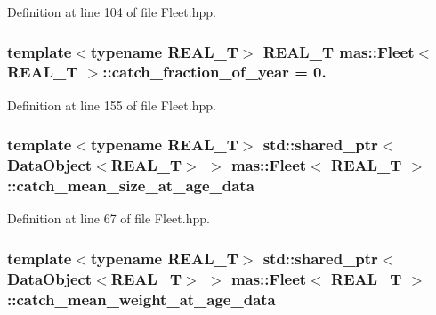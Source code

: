 Definition at line 104 of file Fleet.\-hpp.

\hypertarget{structmas_1_1_fleet_a441dfd7f3172ab329520882e66669ddd}{
\subsubsection[{catch\-\_\-fraction\-\_\-of\-\_\-year}]{\setlength{\rightskip}{0pt plus 5cm}template$<$typename R\-E\-A\-L\-\_\-\-T$>$ R\-E\-A\-L\-\_\-\-T {\bf mas\-::\-Fleet}$<$ R\-E\-A\-L\-\_\-\-T $>$\-::catch\-\_\-fraction\-\_\-of\-\_\-year = 0.}}\label{structmas_1_1_fleet_a441dfd7f3172ab329520882e66669ddd}


Definition at line 155 of file Fleet.\-hpp.

\hypertarget{structmas_1_1_fleet_a46862ac16c8d360c9290dad74aee9a17}{
\subsubsection[{catch\-\_\-mean\-\_\-size\-\_\-at\-\_\-age\-\_\-data}]{\setlength{\rightskip}{0pt plus 5cm}template$<$typename R\-E\-A\-L\-\_\-\-T$>$ std\-::shared\-\_\-ptr$<${\bf Data\-Object}$<$R\-E\-A\-L\-\_\-\-T$>$ $>$ {\bf mas\-::\-Fleet}$<$ R\-E\-A\-L\-\_\-\-T $>$\-::catch\-\_\-mean\-\_\-size\-\_\-at\-\_\-age\-\_\-data}}\label{structmas_1_1_fleet_a46862ac16c8d360c9290dad74aee9a17}


Definition at line 67 of file Fleet.\-hpp.

\hypertarget{structmas_1_1_fleet_acc8b3609ca90f6efd5801fb8820777f8}{
\subsubsection[{catch\-\_\-mean\-\_\-weight\-\_\-at\-\_\-age\-\_\-data}]{\setlength{\rightskip}{0pt plus 5cm}template$<$typename R\-E\-A\-L\-\_\-\-T$>$ std\-::shared\-\_\-ptr$<${\bf Data\-Object}$<$R\-E\-A\-L\-\_\-\-T$>$ $>$ {\bf mas\-::\-Fleet}$<$ R\-E\-A\-L\-\_\-\-T $>$\-::catch\-\_\-mean\-\_\-weight\-\_\-at\-\_\-age\-\_\-data}}\label{structmas_1_1_fleet_acc8b3609ca90f6efd5801fb8820777f8}


